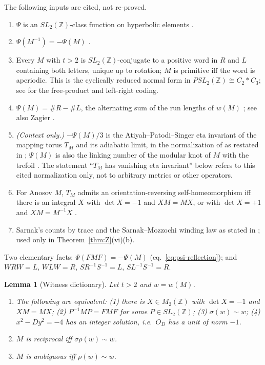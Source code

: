 \documentclass[11pt]{article}
\newtheorem{lemma}[theorem]{Lemma}
\theoremstyle{definition}
\newcommand{\Z}{\mathbb Z}
\begin{document}
The following inputs are cited, not re-proved.
\begin{enumerate}[label=(K\arabic*)]
\item $\Psi$ is an $SL_2(\Z)$-class function on hyperbolic elements
\cite[Ch.~4]{RademacherGrosswald1972}.
\item $\Psi(M^{-1})=-\Psi(M)$ \cite[Lem.~6.1(ii)]{BurrinVonEssen2024}.
\item Every $M$ with $t>2$ is $SL_2(\Z)$-conjugate to a positive word in
$R$ and $L$ containing both letters, unique up to rotation; $M$ is
primitive iff the word is aperiodic.  This is the cyclically reduced
normal form in $PSL_2(\Z)\cong C_2*C_3$; see
\cite[pp.~268,272]{Ghys2006} for the free-product and left-right coding.
\item $\Psi(M)=\#R-\#L$, the alternating sum of the run lengths of $w(M)$
\cite[Prop.~4.1]{BurrinVonEssen2024}; see also Zagier
\cite{Zagier1975}.
\item \emph{(Context only.)}  $-\Psi(M)/3$ is the Atiyah--Patodi--Singer
eta invariant of the mapping torus $T_M$ and its adiabatic limit, in the
normalization of \cite[eq.~(5.60)]{Atiyah1987} as restated in
\cite[Sec.~4.2]{BurrinVonEssen2024}; $\Psi(M)$ is also the linking number
of the modular knot of $M$ with the trefoil \cite{Ghys2006}.  The
statement ``$T_M$ has vanishing eta invariant'' below refers to this
cited normalization only, not to arbitrary metrics or other operators.
\item For Anosov $M$, $T_M$ admits an orientation-reversing
self-homeomorphism iff there is an integral $X$ with $\det X=-1$ and
$XM=MX$, or with $\det X=+1$ and $XM=M^{-1}X$
\cite[Sec.~1.3 and the Anosov case of the degree theorem]{SunWangWu2008}.
\item Sarnak's counts by trace \cite[Thm.~2]{Sarnak2007} and the
Sarnak--Mozzochi winding law as stated in
\cite[Cor.~1.3]{BurrinVonEssen2024}; used only in
Theorem~\ref{thm:Z}(vi)(b).
\end{enumerate}
Two elementary facts: $\Psi(FMF)=-\Psi(M)$ (eq.~\eqref{eq:psi-reflection});
and $WRW=L$, $WLW=R$, $SR^{-1}S^{-1}=L$, $SL^{-1}S^{-1}=R$.

\begin{lemma}[Witness dictionary]
\label{lem:W}
Let $t>2$ and $w=w(M)$.
\begin{enumerate}[label=(\alph*)]
\item The following are equivalent: (1) there is $X\in M_2(\Z)$ with
$\det X=-1$ and $XM=MX$; (2) $P^{-1}MP=FMF$ for some $P\in SL_2(\Z)$;
(3) $\sigma(w)\sim w$; (4) $x^2-Dy^2=-4$ has an integer solution, i.e.\
$O_D$ has a unit of norm $-1$.
\item $M$ is reciprocal iff $\sigma\rho(w)\sim w$.
\item $M$ is ambiguous iff $\rho(w)\sim w$.
\end{enumerate}
\end{lemma}
\end{document}
